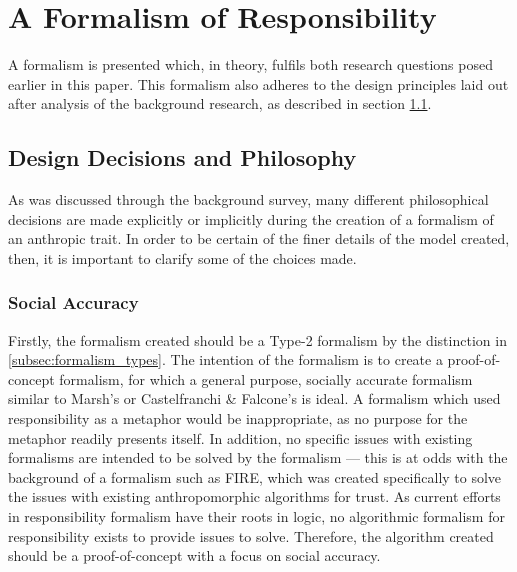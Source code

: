 \section{A Formalism of Responsibility}\label{sec:formalism_details}
A formalism is presented which, in theory, fulfils both research questions posed earlier in this paper. This formalism also adheres to the design principles laid out after analysis of the background research, as described in section \ref{subsec:design}.\par

\subsection{Design Decisions and Philosophy}\label{subsec:design}
As was discussed through the background survey, many different philosophical decisions are made explicitly or implicitly during the creation of a formalism of an anthropic trait. In order to be certain of the finer details of the model created, then, it is important to clarify some of the choices made.\par

\subsubsection{Social Accuracy}\label{subsec:needing_type_2}
Firstly, the formalism created should be a Type-2 formalism by the distinction in \cref{subsec:formalism_types}. The intention of the formalism is to create a proof-of-concept formalism, for which a general purpose, socially accurate formalism similar to Marsh's or Castelfranchi \& Falcone's is ideal. A formalism which used responsibility as a metaphor would be inappropriate, as no purpose for the metaphor readily presents itself. In addition, no specific issues with existing formalisms are intended to be solved by the formalism --- this is at odds with the background of a formalism such as FIRE, which was created specifically to solve the issues with existing anthropomorphic algorithms for trust. As current efforts in responsibility formalism have their roots in logic, no algorithmic formalism for responsibility exists to provide issues to solve. Therefore, the algorithm created should be a proof-of-concept with a focus on social accuracy.\par

